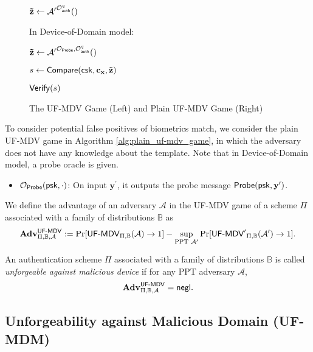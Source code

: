 \begin{figure}[h]
\begin{minipage}[t]{0.45\linewidth}
\begin{algorithm}[H]
\begin{algorithmic}[1]
		\State \hspace{\algorithmicindent} ${\mathbf{\tilde{z}}} \gets \mathcal{A'}^{\mathcal{O}_{\sf auth}^q}()$

		\State In Device-of-Domain model:

		\State \hspace{\algorithmicindent} ${\mathbf{\tilde{z}}} \gets \mathcal{A'}^{\mathcal{O}_{\sf Probe}, \mathcal{O}_{\sf auth}^q}()$
		
		\State $s \gets {\sf Compare}( {\sf csk}, \mathbf{c_x}, \mathbf{\tilde{z}} )$

		\State \Return ${\sf Verify}(s)$
	\end{algorithmic}
	\end{algorithm}
	\end{minipage}

\caption{The \textsf{UF-MDV} Game (Left) and Plain \textsf{UF-MDV} Game (Right)}
\label{fig:uf-mdv_game}
\end{figure}

To consider potential false positives of biometrics match, we consider the plain \textsf{UF-MDV} game in Algorithm \ref{alg:plain_uf-mdv_game}, in which the adversary does not have any knowledge about the template. Note that in Device-of-Domain model, a probe oracle is given.

\begin{itemize}

	\item $\mathcal{O}_{\sf Probe}({\sf psk}, \cdot)$: On input $\mathbf{y}^\prime$, it outputs the probe message ${\sf Probe}({\sf psk}, \mathbf{y}^\prime)$.

\end{itemize}

We define the advantage of an adversary $\mathcal{A}$ in the \textsf{UF-MDV} game of a scheme $\Pi$ associated with a family of distributions $\mathbb{B}$ as
\[
	\mathbf{Adv}^{\textsf{UF-MDV}}_{\Pi, \mathbb{B}, \mathcal{A}} := \Pr[{\textsf{UF-MDV}}_{\Pi, \mathbb{B}}(\mathcal{A}) \to 1] -
	\sup_{\text{PPT } \mathcal{A'}} \Pr[{\textsf{UF-MDV}^\prime}_{\Pi, \mathbb{B}}(\mathcal{A}^\prime) \to 1].
\]

An authentication scheme $\Pi$ associated with a family of distributions $\mathbb{B}$ is called \emph{unforgeable against malicious device} if for any PPT adversary $\mathcal{A}$,
\[
	\mathbf{Adv}^{\textsf{UF-MDV}}_{\Pi, \mathbb{B}, \mathcal{A}} = \mathsf{negl}.
\]




\subsection{Unforgeability against Malicious Domain (\textsf{UF-MDM})}
\label{sec:uf-mdm_game}

